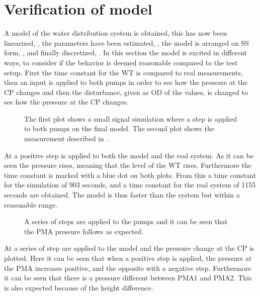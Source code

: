 \section{Verification of model}
\label{verification_of_model}

A model of the water distribution system is obtained, this has now been linearized, , the parameters have been estimated, , the model is arranged on SS form, , and finally discretized, . In this section the model is excited in different ways, to consider if the behavior is deemed reasonable compared to the test setup. First the time constant for the WT is compared to real measurements, then an input is applied to both pumps in order to see how the pressure at the CP changes and then the disturbance, given as OD of the values, is changed to see how the pressure at the CP changes. 

\begin{figure}[H]
   \centering
    
    \caption{The first plot shows a small signal simulation where a step is applied to both pumps on the final model. The second plot shows the measurement described in .}
    \label{simulation_time_constant}
\end{figure}

At  a positive step is applied to both the model and the real system. As it can be seen the pressure rises, meaning that the level of the WT rises. Furthermore the time constant is marked with a blue dot on both plots. From this a time constant for the simulation of 903 seconds, and a time constant for the real system of 1155 seconds are obtained. The model is thus faster than the system but within a reasonable range.

\begin{figure}[H]
   \centering
    
    \caption{A series of steps are applied to the pumps and it can be seen that the PMA pressure follows as expected.}
    \label{input_simulation}
\end{figure}

At  a series of step are applied to the model and the pressure change at the CP is plotted. Here it can be seen that when a positive step is applied, the pressure at the PMA increases positive, and the opposite with a negative step. Furthermore it can be seen that there is a pressure different between PMA1 and PMA2. This is also expected because of the height difference.  

